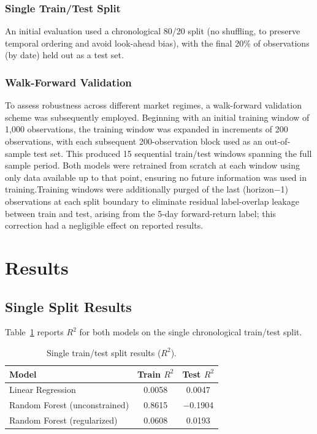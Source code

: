 \documentclass[11pt]{article}
\begin{document}
\subsubsection{Single Train/Test Split}
An initial evaluation used a chronological 80/20 split (no shuffling, to preserve temporal ordering and avoid look-ahead bias), with the final 20\% of observations (by date) held out as a test set.

\subsubsection{Walk-Forward Validation}
To assess robustness across different market regimes, a walk-forward validation scheme was subsequently employed. Beginning with an initial training window of 1{,}000 observations, the training window was expanded in increments of 200 observations, with each subsequent 200-observation block used as an out-of-sample test set. This produced 15 sequential train/test windows spanning the full sample period. Both models were retrained from scratch at each window using only data available up to that point, ensuring no future information was used in training.Training windows were additionally purged of the last (horizon−1) observations at each split boundary to eliminate residual label-overlap leakage between train and test, arising from the 5-day forward-return label; this correction had a negligible effect on reported results.

\section{Results}

\subsection{Single Split Results}
Table~\ref{tab:single_split} reports $R^2$ for both models on the single chronological train/test split.

\begin{table}[h]
\centering
\begin{tabular}{lcc}
\toprule
Model & Train $R^2$ & Test $R^2$ \\
\midrule
Linear Regression & 0.0058 & 0.0047 \\
Random Forest (unconstrained) & 0.8615 & $-$0.1904 \\
Random Forest (regularized) & 0.0608 & 0.0193 \\
\bottomrule
\end{tabular}
\caption{Single train/test split results ($R^2$).}
\label{tab:single_split}
\end{table}
\end{document}
